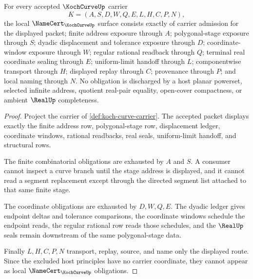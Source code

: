 \begin{theorem}
\label{thm:koch-curve-namecert-obligations}
For every accepted $\KochCurveUp$ carrier
$$
K=(A,S,D,W,Q,E,L,H,C,P,N),
$$
the local $\NameCert_{\KochCurveUp}$ surface consists exactly of carrier admission for the displayed packet; finite address exposure through $A$; polygonal-stage exposure through $S$; dyadic displacement and tolerance exposure through $D$; coordinate-window exposure through $W$; regular rational readback through $Q$; terminal real coordinate sealing through $E$; uniform-limit handoff through $L$; componentwise transport through $H$; displayed replay through $C$; provenance through $P$; and local naming through $N$. No obligation is discharged by a host planar powerset, selected infinite address, quotient real-pair equality, open-cover compactness, or ambient $\RealUp$ completeness.
\end{theorem}
\begin{proof}
Project the carrier of \autoref{def:koch-curve-carrier}. The accepted packet displays exactly the finite address row, polygonal-stage row, displacement ledger, coordinate windows, rational readbacks, real seals, uniform-limit handoff, and structural rows.

The finite combinatorial obligations are exhausted by $A$ and $S$. A consumer cannot inspect a curve branch until the stage address is displayed, and it cannot read a segment replacement except through the directed segment list attached to that same finite stage.

The coordinate obligations are exhausted by $D,W,Q,E$. The dyadic ledger gives endpoint deltas and tolerance comparisons, the coordinate windows schedule the endpoint reads, the regular rational row reads those schedules, and the $\RealUp$ seals remain downstream of the same polygonal-stage data.

Finally $L,H,C,P,N$ transport, replay, source, and name only the displayed route. Since the excluded host principles have no carrier coordinate, they cannot appear as local $\NameCert_{\KochCurveUp}$ obligations.
\end{proof}

